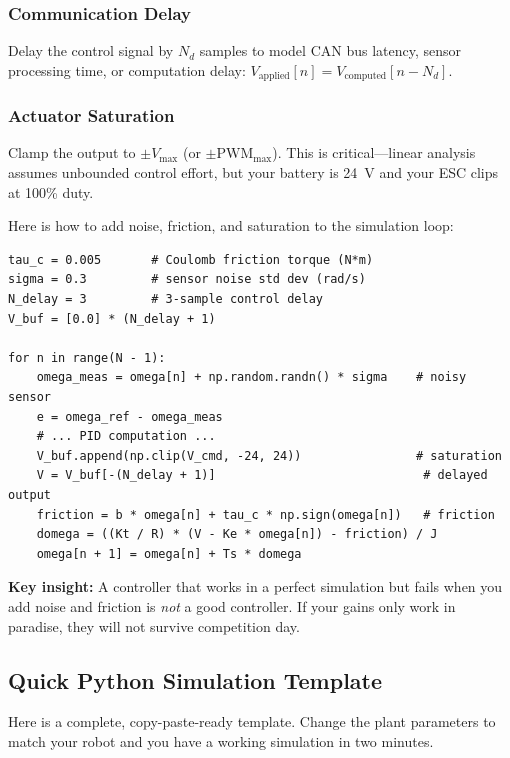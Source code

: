 \subsubsection{Communication Delay}

Delay the control signal by $N_d$ samples to model CAN bus latency, sensor
processing time, or computation delay:
$V_{\text{applied}}[n] = V_{\text{computed}}[n - N_d]$.

\subsubsection{Actuator Saturation}

Clamp the output to $\pm V_{\max}$ (or $\pm \text{PWM}_{\max}$). This is
critical---linear analysis assumes unbounded control effort, but your battery
is 24~V and your ESC clips at 100\% duty.

Here is how to add noise, friction, and saturation to the simulation loop:

\begin{verbatim}
tau_c = 0.005       # Coulomb friction torque (N*m)
sigma = 0.3         # sensor noise std dev (rad/s)
N_delay = 3         # 3-sample control delay
V_buf = [0.0] * (N_delay + 1)

for n in range(N - 1):
    omega_meas = omega[n] + np.random.randn() * sigma    # noisy sensor
    e = omega_ref - omega_meas
    # ... PID computation ...
    V_buf.append(np.clip(V_cmd, -24, 24))                # saturation
    V = V_buf[-(N_delay + 1)]                             # delayed output
    friction = b * omega[n] + tau_c * np.sign(omega[n])   # friction
    domega = ((Kt / R) * (V - Ke * omega[n]) - friction) / J
    omega[n + 1] = omega[n] + Ts * domega
\end{verbatim}

\textbf{Key insight:} A controller that works in a perfect simulation but
fails when you add noise and friction is \textit{not} a good controller. If
your gains only work in paradise, they will not survive competition day.

\subsection{Quick Python Simulation Template}

Here is a complete, copy-paste-ready template. Change the plant parameters to
match your robot and you have a working simulation in two minutes.

